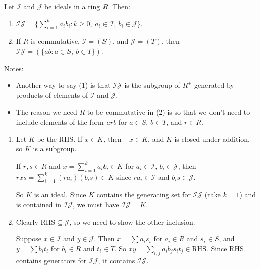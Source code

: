 \documentclass[12pt,letterpaper]{report}
\begin{document}
\begin{lem}{}{}
  Let $\mathcal{I}$ and $\mathcal{J}$ be ideals in a ring $R$.
  Then:
  \begin{enumerate}
    \item $\mathcal{IJ} =
      \{ \sum_{i = 1}^k a_i b_i : k \geq 0, \ a_i \in \mathcal{I}, \ b_i \in \mathcal{J} \}$.
    \item If $R$ is commutative, $\mathcal{I} = (S)$, and $\mathcal{J} = (T)$, then
      $\mathcal{IJ} = (\{ ab : a \in S, \ b \in T \})$.
  \end{enumerate}
\end{lem}

Notes:
\begin{itemize}
  \item Another way to say (1) is that $\mathcal{IJ}$ is the subgroup of $R^+$ generated by
    products of elements of $\mathcal{I}$ and $\mathcal{J}$.
  \item The reason we need $R$ to be commutative in (2) is so that we don't need to include
    elements of the form $arb$ for $a \in S$, $b \in T$, and $r \in R$.
\end{itemize}

\begin{thmproof}
  \begin{enumerate}
    \item
    Let $K$ be the RHS.
    If $x \in K$, then $-x \in K$, and $K$ is closed under addition, so $K$ is a subgroup.

    If $r, s \in R$ and $x = \sum_{i = 1}^k a_i b_i \in K$ for $a_i \in \mathcal{I}$,
    $b_i \in \mathcal{J}$, then $rxs = \sum_{i = 1}^k (ra_i)(b_is) \in K$ since
    $ra_i \in \mathcal{I}$ and $b_is \in \mathcal{J}$.

    So $K$ is an ideal.
    Since $K$ contains the generating set for $\mathcal{IJ}$ (take $k = 1$) and is contained in
    $\mathcal{IJ}$, we must have $\mathcal{IJ} = K$.

    \item
    Clearly $\text{RHS} \subseteq \mathcal{J}$, so we need to show the other inclusion.

    Suppose $x \in \mathcal{I}$ and $y \in \mathcal{J}$.
    Then $x = \sum a_i s_i$ for $a_i \in R$ and $s_i \in S$, and $y = \sum b_i t_i$ for $b_i \in R$
    and $t_i \in T$.
    So $xy = \sum_{i, j} a_i b_j s_i t_j \in \text{RHS}$.
    Since RHS contains generators for $\mathcal{IJ}$, it contains $\mathcal{IJ}$.
  \end{enumerate}
\end{thmproof}
\end{document}
